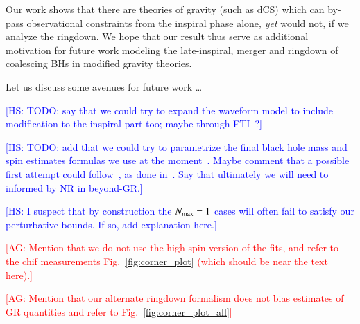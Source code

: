 \documentclass[twocolumn,
               prd,
               aps,
               superscriptaddress,
               tightenlines,
               nofootinbib,
               eqsecnum,
               amsfonts,
               amsmath,
               longbibliography]{revtex4-1}
\newcommand{\agcomm}[1]{{\textcolor{red}{{[AG: #1]}} }}
\newcommand{\hs}[1]{{\textcolor{blue}{{[HS: #1]}} }}
\begin{document}
Our work shows that there are theories of gravity (such as dCS) which can by-pass observational
constraints from the inspiral phase alone, {\it yet} would not, if we
analyze the ringdown.
%
We hope that our result thus serve as additional motivation for future work
modeling the late-inspiral, merger and ringdown of coalescing BHs in modified
gravity theories.

Let us discuss some avenues for future work \dots

\hs{TODO: say that we could try to expand the waveform model to include modification to
the inspiral part too; maybe through FTI~\cite{Mehta:2022pcn}?}

\hs{TODO: add that we could try to parametrize the final black hole mass and spin estimates formulas we
use at the moment~\cite{Hofmann:2016yih}. Maybe comment that a possible first attempt could follow~\cite{Buonanno:2007sv},
as done in~\cite{Jai-akson:2017ldo,Li:2020wse}. Say that ultimately we will need to informed by NR in beyond-GR.}

\hs{I suspect that by construction the $N_{\rm max} = 1$ cases will often fail to satisfy our
perturbative bounds. If so, add explanation here.}

\agcomm{Mention that we do not use the high-spin version of the fits, and refer to the
chif measurements Fig.~\ref{fig:corner_plot} (which should be near the text here).}

\agcomm{Mention that our alternate ringdown formalism does not bias estimates of GR quantities
and refer to Fig.~\ref{fig:corner_plot_all}}
\end{document}
